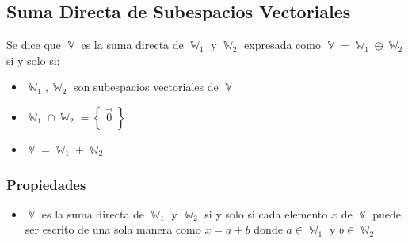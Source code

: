 \documentclass[12pt, fleqn]{report}                             %
\theoremstyle{break}                                            %
\DeclareMathOperator \VectorSet    {\mathbb{V}}                 %
\DeclareMathOperator \SubVectorSet {\mathbb{W}}                 %
\newcommand{\Set}[1]            {\left\{ \; #1 \; \right\}}     %
\begin{document}
            \clearpage
            \subsection{Suma Directa de Subespacios Vectoriales}

                Se dice que $\VectorSet$ es la suma directa de $\SubVectorSet_1$ y $\SubVectorSet_2$
                expresada como $\VectorSet = \SubVectorSet_1 \oplus \SubVectorSet_2$ si y solo si:

                \begin{itemize}
                    \item $\SubVectorSet_1, \SubVectorSet_2$ son subespacios vectoriales de $\VectorSet$
                    \item $\SubVectorSet_1 \cap \SubVectorSet_2 = \Set{\vec{0}}$
                    \item $\VectorSet = \SubVectorSet_1 + \SubVectorSet_2$
                \end{itemize}


            \vspace{1em}
            \subsubsection{Propiedades}

                \begin{itemize}
                    
                    \item 
                        $\VectorSet$ es la suma directa de $\SubVectorSet_1$ y $\SubVectorSet_2$ si y solo si
                        cada elemento $x$ de $\VectorSet$ puede ser escrito de una sola manera como 
                        $x = a + b$ donde $a \in \SubVectorSet_1$ y $b \in \SubVectorSet_2$

                \end{itemize}


        \clearpage
\end{document}
